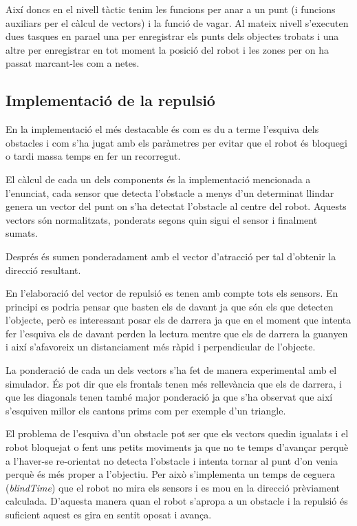 Així doncs en el nivell tàctic tenim les funcions per anar a un punt (i funcions auxiliars per el càlcul
de vectors) i la funció de vagar. Al mateix nivell s'executen dues tasques en para\lgem el una per
enregistrar els punts dels objectes trobats i una altre per enregistrar en tot moment la posició del 
robot i les zones per on ha passat marcant-les com a netes.

\subsection{Implementació de la repulsió}

En la implementació el més destacable és com es du a terme l'esquiva dels obstacles i com s'ha jugat amb
els paràmetres per evitar que el robot és bloquegi o tardi massa temps en fer un recorregut. 

El càlcul de cada un dels components és la implementació mencionada a l'enunciat, cada sensor que
detecta l'obstacle a menys d'un determinat llindar genera un vector del punt on s'ha detectat l'obstacle
al centre del robot. Aquests vectors són normalitzats, ponderats segons quin sigui el sensor i finalment
sumats.

Després és sumen ponderadament amb el vector d'atracció per tal d'obtenir la
direcció resultant.

En l'elaboració del vector de repulsió es tenen amb compte tots els sensors. En principi es podria pensar
que basten els de davant ja que són els que detecten l'objecte, però es interessant posar els de darrera
ja que en el moment que intenta fer l'esquiva els de davant perden la lectura
mentre que els de darrera la guanyen i així s'afavoreix un distanciament més
ràpid i perpendicular de l'objecte. 

La ponderació de cada un dels vectors s'ha fet de manera experimental amb el
simulador. És pot dir que els frontals tenen més rellevància que els de darrera,
i que les diagonals tenen també major ponderació ja que s'ha observat que així
s'esquiven millor els cantons prims com per exemple d'un triangle.

El problema de l'esquiva d'un obstacle pot ser que els vectors quedin igualats i el robot bloquejat
o fent uns petits moviments ja que no te temps d'avançar perquè a l'haver-se
re-orientat no detecta l'obstacle i intenta tornar al punt d'on venia perquè és
més proper a l'objectiu. Per això s'implementa un temps de
ceguera (\emph{blindTime}) que el robot no mira els sensors i es mou en la
direcció prèviament calculada. D'aquesta manera quan el robot s'apropa a un
obstacle i la repulsió és suficient aquest es gira en sentit oposat i avança.

